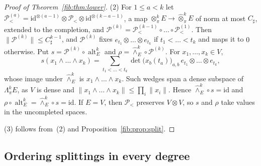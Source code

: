 \documentclass[11pt]{amsart}
\theoremstyle{definition}
\theoremstyle{remark}
\numberwithin{equation}{section}
\newcommand{\id}{\mathrm{id}}
\newcommand{\norm}[1]{\lVert #1\rVert}
\theoremstyle{plain}
\theoremstyle{definition}
\theoremstyle{plain}
\newcommand{\cP}{\mathcal P}
\begin{document}
\begin{proof}[Proof of Theorem~\ref{fib:thm:lower}]
(2) For $1\le a<k$ let $\cP_<^{(a)}=\id^{\otimes(a-1)}\otimes\cP_<\otimes\id^{\otimes(k-a-1)}$, a map
$\otimes^k_\pi E\to\widehat\otimes^k_\pi E$ of norm at most $C_\sharp$, extended to the completion, and
$\cP^{(k)}=\cP_<^{(k-1)}\circ\dots\circ\cP_<^{(1)}$. Then $\norm{\cP^{(k)}}\le C_\sharp^{k-1}$, and $\cP^{(k)}$ fixes
$e_{t_1}\otimes\dots\otimes e_{t_k}$ if $t_1<\dots<t_k$ and maps it to $0$ otherwise. Put
$s=\cP^{(k)}\circ\operatorname{alt}^k_E$ and $\rho=\widehat\wedge^k_E\circ\cP^{(k)}$. For $x_1,\dots,x_k\in V$,
\[
 s(x_1\wedge\dots\wedge x_k)=\sum_{t_1<\dots<t_k}\det\bigl(x_b(t_a)\bigr)_{a,b}\,e_{t_1}\otimes\dots\otimes e_{t_k},
\]
whose image under $\widehat\wedge^k_E$ is $x_1\wedge\dots\wedge x_k$. Such wedges span a dense subspace of
$\Lambda^k_\pi E$, as $V$ is dense and $\norm{x_1\wedge\dots\wedge x_k}\le\prod_i\norm{x_i}$. Hence
$\widehat\wedge^k_E\circ s=\id$ and $\rho\circ\operatorname{alt}^k_E=\widehat\wedge^k_E\circ s=\id$. If $E=V$, then
$\cP_<$ preserves $V\otimes V$, so $s$ and $\rho$ take values in the uncompleted spaces.

(3) follows from~(2) and Proposition~\ref{fib:prop:split}.
\end{proof}

\subsection{Ordering splittings in every degree}\label{ord:ssec:ordering}
\end{document}
